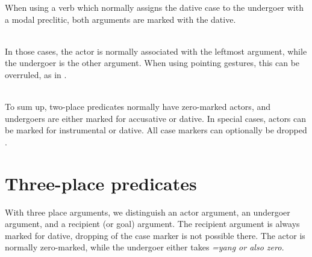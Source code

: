 When using a verb which normally assigns the dative case to the undergoer with a modal preclitic, both arguments are marked with the dative. 

 \\
In those cases, the actor is normally associated with the leftmost argument, while the undergoer is the other argument. When using pointing gestures, this can be overruled, as in .

 \\
To sum up, two-place predicates normally have zero-marked actors, and undergoers are either marked for accusative or dative. In special cases, actors can be marked for instrumental or dative. All case markers can optionally be dropped \citep{Ansaldo2005ms, Ansaldo2008genesis, Ansaldo2009}.



\section{Three-place predicates}\label{sec:argstr:Three-placepredicates}
With three place arguments, we distinguish an actor argument, an undergoer argument, and a recipient (or goal) argument. The recipient argument is always marked for dative, dropping of the case marker is not possible there. The actor is normally zero-marked, while the undergoer either takes \em =yang \em or also zero.  

